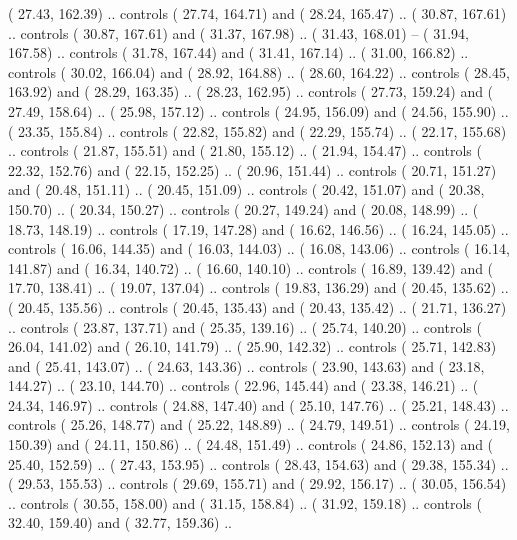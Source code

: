 {        (  27.43, 162.39) .. controls (  27.74, 164.71) and (  28.24, 165.47) ..
        (  30.87, 167.61) .. controls (  30.87, 167.61) and (  31.37, 167.98) ..
        (  31.43, 168.01) -- 
        (  31.94, 167.58) .. controls (  31.78, 167.44) and (  31.41, 167.14) ..
        (  31.00, 166.82) .. controls (  30.02, 166.04) and (  28.92, 164.88) ..
        (  28.60, 164.22) .. controls (  28.45, 163.92) and (  28.29, 163.35) ..
        (  28.23, 162.95) .. controls (  27.73, 159.24) and (  27.49, 158.64) ..
        (  25.98, 157.12) .. controls (  24.95, 156.09) and (  24.56, 155.90) ..
        (  23.35, 155.84) .. controls (  22.82, 155.82) and (  22.29, 155.74) ..
        (  22.17, 155.68) .. controls (  21.87, 155.51) and (  21.80, 155.12) ..
        (  21.94, 154.47) .. controls (  22.32, 152.76) and (  22.15, 152.25) ..
        (  20.96, 151.44) .. controls (  20.71, 151.27) and (  20.48, 151.11) ..
        (  20.45, 151.09) .. controls (  20.42, 151.07) and (  20.38, 150.70) ..
        (  20.34, 150.27) .. controls (  20.27, 149.24) and (  20.08, 148.99) ..
        (  18.73, 148.19) .. controls (  17.19, 147.28) and (  16.62, 146.56) ..
        (  16.24, 145.05) .. controls (  16.06, 144.35) and (  16.03, 144.03) ..
        (  16.08, 143.06) .. controls (  16.14, 141.87) and (  16.34, 140.72) ..
        (  16.60, 140.10) .. controls (  16.89, 139.42) and (  17.70, 138.41) ..
        (  19.07, 137.04) .. controls (  19.83, 136.29) and (  20.45, 135.62) ..
        (  20.45, 135.56) .. controls (  20.45, 135.43) and (  20.43, 135.42) ..
        (  21.71, 136.27) .. controls (  23.87, 137.71) and (  25.35, 139.16) ..
        (  25.74, 140.20) .. controls (  26.04, 141.02) and (  26.10, 141.79) ..
        (  25.90, 142.32) .. controls (  25.71, 142.83) and (  25.41, 143.07) ..
        (  24.63, 143.36) .. controls (  23.90, 143.63) and (  23.18, 144.27) ..
        (  23.10, 144.70) .. controls (  22.96, 145.44) and (  23.38, 146.21) ..
        (  24.34, 146.97) .. controls (  24.88, 147.40) and (  25.10, 147.76) ..
        (  25.21, 148.43) .. controls (  25.26, 148.77) and (  25.22, 148.89) ..
        (  24.79, 149.51) .. controls (  24.19, 150.39) and (  24.11, 150.86) ..
        (  24.48, 151.49) .. controls (  24.86, 152.13) and (  25.40, 152.59) ..
        (  27.43, 153.95) .. controls (  28.43, 154.63) and (  29.38, 155.34) ..
        (  29.53, 155.53) .. controls (  29.69, 155.71) and (  29.92, 156.17) ..
        (  30.05, 156.54) .. controls (  30.55, 158.00) and (  31.15, 158.84) ..
        (  31.92, 159.18) .. controls (  32.40, 159.40) and (  32.77, 159.36) ..
}

